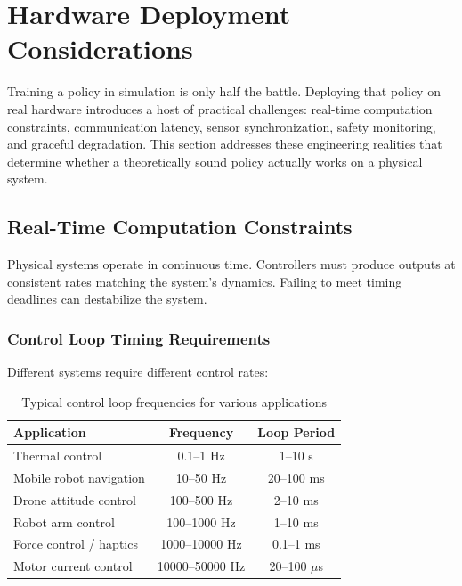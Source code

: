 
\section{Hardware Deployment Considerations}
\label{sec:hardware_deployment}

Training a policy in simulation is only half the battle. Deploying that policy on real hardware introduces a host of practical challenges: real-time computation constraints, communication latency, sensor synchronization, safety monitoring, and graceful degradation. This section addresses these engineering realities that determine whether a theoretically sound policy actually works on a physical system.

\subsection{Real-Time Computation Constraints}

Physical systems operate in continuous time. Controllers must produce outputs at consistent rates matching the system's dynamics. Failing to meet timing deadlines can destabilize the system.

\subsubsection{Control Loop Timing Requirements}

Different systems require different control rates:

\begin{table}[htbp]
\centering
\caption{Typical control loop frequencies for various applications}
\label{tab:control_frequencies}
\begin{tabular}{lcc}
\toprule
\textbf{Application} & \textbf{Frequency} & \textbf{Loop Period} \\
\midrule
Thermal control & 0.1--1 Hz & 1--10 s \\
Mobile robot navigation & 10--50 Hz & 20--100 ms \\
Drone attitude control & 100--500 Hz & 2--10 ms \\
Robot arm control & 100--1000 Hz & 1--10 ms \\
Force control / haptics & 1000--10000 Hz & 0.1--1 ms \\
Motor current control & 10000--50000 Hz & 20--100 $\mu$s \\
\bottomrule
\end{tabular}
\end{table}

